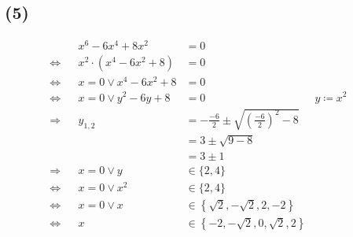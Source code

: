 \documentclass[]{article}
\begin{document}
	\subsection*{(5)}
	\begin{samepage}
	\begin{align*}
		&& x^6-6x^4+ 8x^2 &= 0 &&\\
		\Leftrightarrow&& x^2 \cdot (x^4-6x^2+ 8) &= 0 &&\\
		\Leftrightarrow&& x = 0 \lor x^4-6x^2+ 8 &= 0 &&\\
		\Leftrightarrow&& x = 0 \lor y^2-6y+ 8 &= 0 & y \coloneqq x^2&\\
		\Rightarrow&& y_{1,2} &= -\frac{-6}{2} \pm \sqrt{\left(\frac{-6}{2}\right)^2 - 8 } &&\\
		&&  &= 3 \pm \sqrt{9-8} &&\\
		&&  &= 3 \pm 1 &&\\
		\Rightarrow&& x=0 \lor y&\in \{2,4\} &&\\
		\Leftrightarrow&& x=0 \lor x^2&\in \{2,4\} &&\\
		\Leftrightarrow&& x=0 \lor x&\in \left\{\sqrt{2}, -\sqrt{2}, 2, -2\right\} &&\\
		\Leftrightarrow&& x&\in \left\{-2, -\sqrt{2}, 0, \sqrt{2}, 2\right\} &&\\
	\end{align*}
	\end{samepage}
\end{document}
